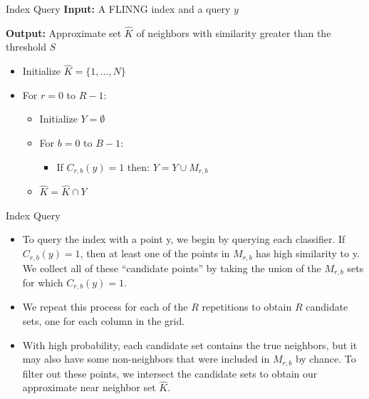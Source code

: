 \documentclass[Serif, 10pt, brown]{beamer}
\theoremstyle{example}
\theoremstyle{plain}
\begin{document}
\begin{frame}{Index Query}
	\textbf{Input:} A FLINNG index and a query $y$

\textbf{Output:} Approximate set $\hat{K}$ of neighbors with similarity greater than the threshold $S$

\begin{itemize}
    \item Initialize $\hat{K} = \{1, \ldots, N\}$
    \item For $r = 0$ to $R - 1$:
    \begin{itemize}
        \item Initialize $Y = \emptyset$
        \item For $b = 0$ to $B - 1$:
        \begin{itemize}
            \item If $C_{r,b}(y) = 1$ then:
                $Y = Y \cup M_{r,b}$
        \end{itemize}
        \item $\hat{K} = \hat{K} \cap Y$
    \end{itemize}
\end{itemize}
\end{frame}

\begin{frame}{Index Query}
	\begin{itemize}
		\item To query the index with a point y, we begin by querying each classifier. If $C_{r,b}(y) = 1$, then at least one of the points in $M_{r,b}$ has high similarity to y. We collect all of these ``candidate points'' by taking the union of the $M_{r,b}$ sets for which $C_{r,b}(y) = 1$. 
		\item We repeat this process for each of the $R$ repetitions to obtain $R$ candidate sets, one for each column in the grid. 
		\item With high probability, each candidate set contains the true neighbors, but it may also have some non-neighbors that were included in $M_{r,b}$ by chance. To filter out these points, we intersect the candidate sets to obtain our approximate near
		neighbor set $\hat{K}$.
	\end{itemize}
\end{frame}
\end{document}
